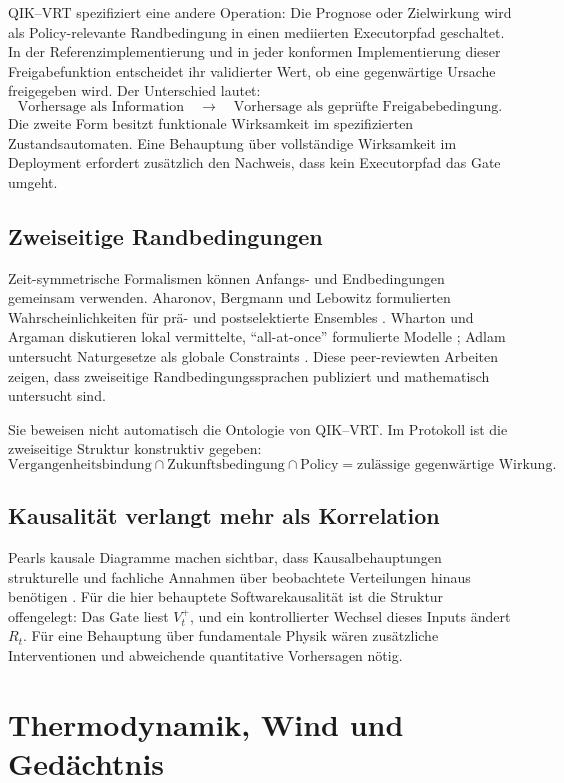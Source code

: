 \documentclass[11pt,a4paper]{article}
\theoremstyle{remark}
\newcommand{\qikvrt}{QIK--VRT}
\begin{document}
\qikvrt{} spezifiziert eine andere Operation: Die Prognose oder Zielwirkung
wird als Policy-relevante Randbedingung in einen mediierten Executorpfad
geschaltet. In der Referenzimplementierung und in jeder konformen
Implementierung dieser Freigabefunktion entscheidet ihr validierter Wert, ob
eine gegenwärtige Ursache freigegeben wird. Der Unterschied lautet:
\[
  \text{Vorhersage als Information}
  \quad\longrightarrow\quad
  \text{Vorhersage als geprüfte Freigabebedingung}.
\]
Die zweite Form besitzt funktionale Wirksamkeit im spezifizierten
Zustandsautomaten. Eine Behauptung über vollständige Wirksamkeit im Deployment
erfordert zusätzlich den Nachweis, dass kein Executorpfad das Gate umgeht.

\subsection{Zweiseitige Randbedingungen}

Zeit-symmetrische Formalismen können Anfangs- und Endbedingungen gemeinsam
verwenden. Aharonov, Bergmann und Lebowitz formulierten Wahrscheinlichkeiten
für prä- und postselektierte Ensembles \cite{abl}. Wharton und Argaman
diskutieren lokal vermittelte, ``all-at-once'' formulierte Modelle
\cite{whartonargaman}; Adlam untersucht Naturgesetze als globale Constraints
\cite{adlam}. Diese peer-reviewten Arbeiten zeigen, dass zweiseitige
Randbedingungssprachen publiziert und mathematisch untersucht sind.

Sie beweisen nicht automatisch die Ontologie von \qikvrt. Im Protokoll ist die
zweiseitige Struktur konstruktiv gegeben:
\[
  \text{Vergangenheitsbindung}
  \cap
  \text{Zukunftsbedingung}
  \cap
  \text{Policy}
  =
  \text{zulässige gegenwärtige Wirkung}.
\]

\subsection{Kausalität verlangt mehr als Korrelation}

Pearls kausale Diagramme machen sichtbar, dass Kausalbehauptungen strukturelle
und fachliche Annahmen über beobachtete Verteilungen hinaus benötigen
\cite{pearl}. Für die hier behauptete Softwarekausalität ist die Struktur
offengelegt: Das Gate liest \(V_t^+\), und ein kontrollierter Wechsel dieses
Inputs ändert \(R_t\). Für eine Behauptung über fundamentale Physik wären
zusätzliche Interventionen und abweichende quantitative Vorhersagen nötig.

\section{Thermodynamik, Wind und Gedächtnis}
\end{document}
